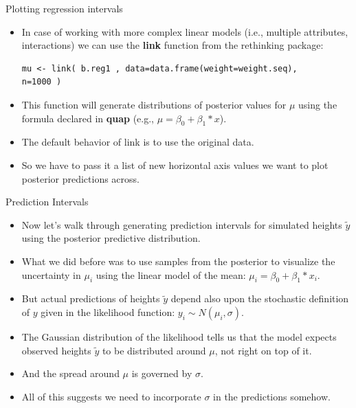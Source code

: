 \documentclass[handout]{beamer}
\begin{document}
\begin{frame}[fragile]{Plotting regression intervals}
\scriptsize{
\begin{itemize}


\item In case of working with more complex linear models (i.e., multiple attributes, interactions) we can use the \textbf{link} function from the rethinking package:

\begin{verbatim}
mu <- link( b.reg1 , data=data.frame(weight=weight.seq),
n=1000 ) 
\end{verbatim}

\item This function will generate distributions of posterior values for $\mu$ using the formula declared in \textbf{quap} (e.g., $\mu= \beta_0 + \beta_1 * x$).

\item The default behavior of link is to use the original data.

\item So we have to pass it a list of new horizontal axis values we want to plot posterior predictions across.

\end{itemize}
 

 
}
\end{frame}


\begin{frame}[fragile]{Prediction Intervals}
\scriptsize{
\begin{itemize}


\item Now let’s walk through generating prediction intervals for simulated heights $\tilde{y}$ using the posterior predictive distribution.

\item What we did before was to use samples from the posterior to visualize the uncertainty in $\mu_i$ using the linear model of the mean: $\mu_i=\beta_0+\beta_1*x_i$. 

\item But actual predictions of heights $\tilde{y}$ depend also upon the stochastic definition of $y$ given in the likelihood function: $y_i\sim N(\mu_i,\sigma)$.

\item The Gaussian distribution of the likelihood tells us that the model expects observed heights $\tilde{y}$ to be distributed around $\mu$, not right on top of it. 

\item And the spread around $\mu$ is governed by $\sigma$. 

\item All of this suggests we need to incorporate $\sigma$ in the predictions somehow.

 


\end{itemize}
 

 
}
\end{frame}
\end{document}
